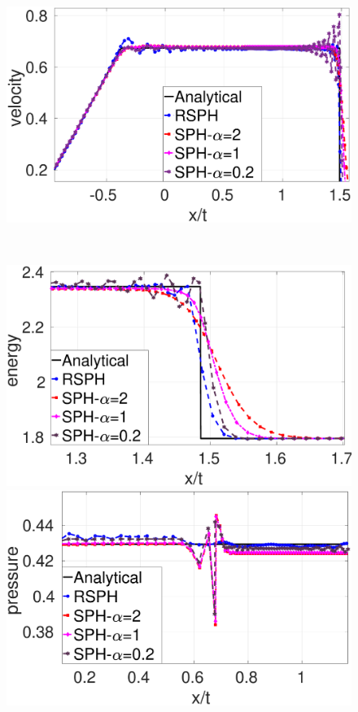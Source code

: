 \begin{figure}[htp]
\begin{minipage}{.495\textwidth}
    \end{minipage}%
    \begin{minipage}{.495 \textwidth}
        \centering
        \includegraphics[width=0.99 \textwidth]{Chapter-4/Figures/Sod/RCM-Sod-SPH-alf-v-zoom}
    \end{minipage}%
    \\
    \begin{minipage}{.495 \textwidth}
        \centering
        \includegraphics[width=0.99 \textwidth]{Chapter-4/Figures/Sod/RCM-Sod-SPH-alf-e-zoom}
    \end{minipage}%
    \begin{minipage}{.495\textwidth}
        \centering
        \includegraphics[width=0.99 \textwidth]{Chapter-4/Figures/Sod/RCM-Sod-SPH-alf-p-zoom}

\end{minipage}
\end{figure}
